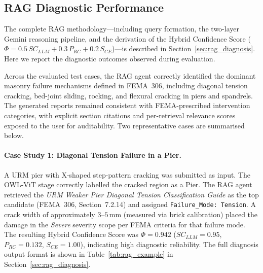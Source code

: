 \subsection{RAG Diagnostic Performance}
\label{subsec:rag_results}

\begin{sloppypar}
The complete RAG methodology---including query formation, the two-layer Gemini
reasoning pipeline, and the derivation of the Hybrid Confidence Score
($\Phi = 0.5\,SC_{LLM} + 0.3\,P_{RC} + 0.2\,S_{CE}$)---is described in
Section~\ref{sec:rag_diagnosis}.
Here we report the diagnostic outcomes observed during evaluation.
\end{sloppypar}

\begin{sloppypar}
Across the evaluated test cases, the RAG agent correctly identified the dominant
masonry failure mechanisms defined in FEMA~306, including diagonal tension
cracking, bed-joint sliding, rocking, and flexural cracking in piers and spandrels.
The generated reports remained consistent with FEMA-prescribed intervention
categories, with explicit section citations and per-retrieval relevance scores
exposed to the user for auditability.
Two representative cases are summarised below.
\end{sloppypar}

\paragraph{Case Study 1: Diagonal Tension Failure in a Pier.}
\begin{sloppypar}
A URM pier with X-shaped step-pattern cracking was submitted as input.
The OWL-ViT stage correctly labelled the cracked region as a Pier.
The RAG agent retrieved the \emph{URM Weaker Pier Diagonal Tension Classification
Guide} as the top candidate (FEMA~306, Section~7.2.14) and assigned
\texttt{Failure\_Mode: Tension}.
A crack width of approximately $3$--$5\,\mathrm{mm}$ (measured via brick
calibration) placed the damage in the \emph{Severe} severity scope per FEMA
criteria for that failure mode.
The resulting Hybrid Confidence Score was $\Phi = 0.942$
($SC_{LLM}=0.95$, $P_{RC}=0.132$, $S_{CE}=1.00$), indicating high diagnostic
reliability.
The full diagnosis output format is shown in Table~\ref{tab:rag_example} in
Section~\ref{sec:rag_diagnosis}.
\end{sloppypar}

